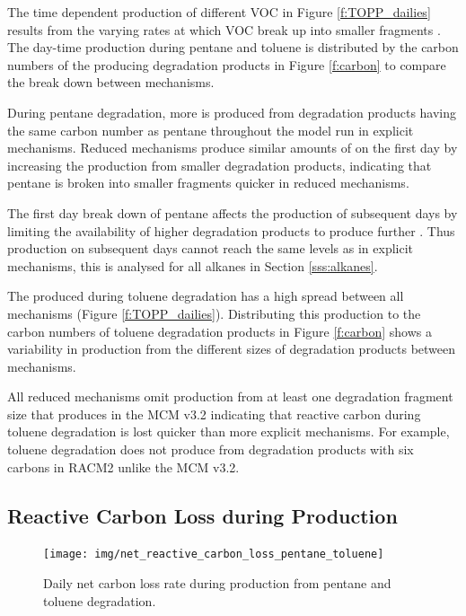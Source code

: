 The time dependent  production of different VOC in Figure \ref{f:TOPP_dailies} results from the varying rates at which VOC break up into smaller fragments \citep{Butler:2011}.
The day-time  production during pentane and toluene is distributed by the carbon numbers of the  producing degradation products in Figure \ref{f:carbon} to compare the break down between mechanisms.

During pentane degradation, more  is produced from degradation products having the same carbon number as pentane throughout the model run in explicit mechanisms.
Reduced mechanisms produce similar amounts of  on the first day by increasing the  production from smaller degradation products, indicating that pentane is broken into smaller fragments quicker in reduced mechanisms.  

The first day break down of pentane affects the  production of subsequent days by limiting the availability of higher degradation products to produce further .
Thus  production on subsequent days cannot reach the same levels as in explicit mechanisms, this is analysed for all alkanes in Section \ref{sss:alkanes}.

The  produced during toluene degradation has a high spread between all mechanisms (Figure \ref{f:TOPP_dailies}).
Distributing this  production to the carbon numbers of toluene degradation products in Figure \ref{f:carbon} shows a variability in  production from the different sizes of degradation products between mechanisms.

All reduced mechanisms omit  production from at least one degradation fragment size that produces  in the MCM v3.2 indicating that reactive carbon during toluene degradation is lost quicker than more explicit mechanisms.
For example, toluene degradation does not produce  from degradation products with six carbons in RACM2 unlike the MCM v3.2.

\subsection[Reactive Carbon Loss during Ox Production]{Reactive Carbon Loss during  Production} \label{ss:carbon_loss}

\begin{figure}
    \centering
    \texttt{[image: img/net\_reactive\_carbon\_loss\_pentane\_toluene]}
    \vspace{0mm}
    \caption{Daily net carbon loss rate during  production from pentane and toluene degradation.}
    \vspace{-4mm}
    \label{f:net_carbon_loss}
\end{figure}

